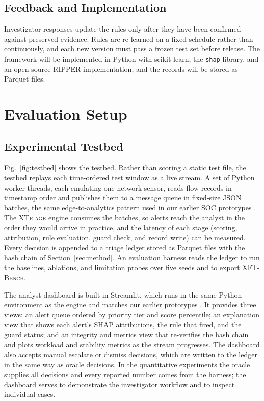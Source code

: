 \documentclass[journal]{IEEEtran}
\begin{document}
\subsection{Feedback and Implementation}
Investigator responses update the rules only after they have been confirmed against preserved evidence. Rules are re-learned on a fixed schedule rather than continuously, and each new version must pass a frozen test set before release. The framework will be implemented in Python with scikit-learn, the \texttt{shap} library, and an open-source RIPPER implementation, and the records will be stored as Parquet files.

\section{Evaluation Setup}
\label{sec:eval}

\subsection{Experimental Testbed}
Fig.~\ref{fig:testbed} shows the testbed. Rather than scoring a static test file, the testbed replays each time-ordered test window as a live stream. A set of Python worker threads, each emulating one network sensor, reads flow records in timestamp order and publishes them to a message queue in fixed-size JSON batches, the same edge-to-analytics pattern used in our earlier SOC prototypes \cite{cysider,excyder}. The \textsc{XTriage} engine consumes the batches, so alerts reach the analyst in the order they would arrive in practice, and the latency of each stage (scoring, attribution, rule evaluation, guard check, and record write) can be measured. Every decision is appended to a triage ledger stored as Parquet files with the hash chain of Section~\ref{sec:method}. An evaluation harness reads the ledger to run the baselines, ablations, and limitation probes over five seeds and to export \textsc{XFT-Bench}.

The analyst dashboard is built in Streamlit, which runs in the same Python environment as the engine and matches our earlier prototypes \cite{cysider,cytrex}. It provides three views: an alert queue ordered by priority tier and score percentile; an explanation view that shows each alert's SHAP attributions, the rule that fired, and the guard status; and an integrity and metrics view that re-verifies the hash chain and plots workload and stability metrics as the stream progresses. The dashboard also accepts manual escalate or dismiss decisions, which are written to the ledger in the same way as oracle decisions. In the quantitative experiments the oracle supplies all decisions and every reported number comes from the harness; the dashboard serves to demonstrate the investigator workflow and to inspect individual cases.
\end{document}
